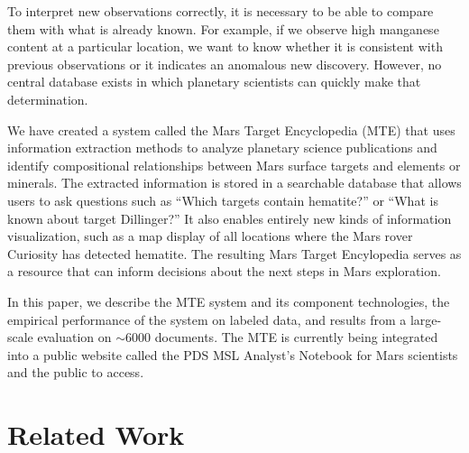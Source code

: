 \documentclass[letterpaper]{article} %
\begin{document}
To interpret new observations correctly, it is necessary to be able to
compare them with what is already known.  For example, if we observe
high manganese content at a particular location, we want to know
whether it is consistent with previous observations or it indicates an
anomalous new discovery.  However, no central database exists in which
planetary scientists can quickly make that determination.

We have created a system called the Mars Target Encyclopedia (MTE)
that uses information extraction methods to analyze planetary science
publications and identify compositional relationships between Mars
surface targets and elements or minerals.  The extracted information
is stored in a searchable database that allows users to ask questions
such as ``Which targets contain hematite?'' or ``What is known about
target Dillinger?''  It also enables entirely new kinds of information
visualization, such as a map display of all locations where the Mars
rover Curiosity has detected hematite.  The resulting Mars Target
Encylopedia serves as a resource that can inform
decisions about the next steps in Mars exploration.  


In this paper, we describe the MTE system and its component
technologies, the empirical performance of the system on labeled data,
and results from a large-scale evaluation on $\sim$6000 documents.
The MTE is currently being integrated into a public website called the
PDS MSL Analyst's Notebook for Mars scientists and the public to
access.


\section{Related Work}
\end{document}
